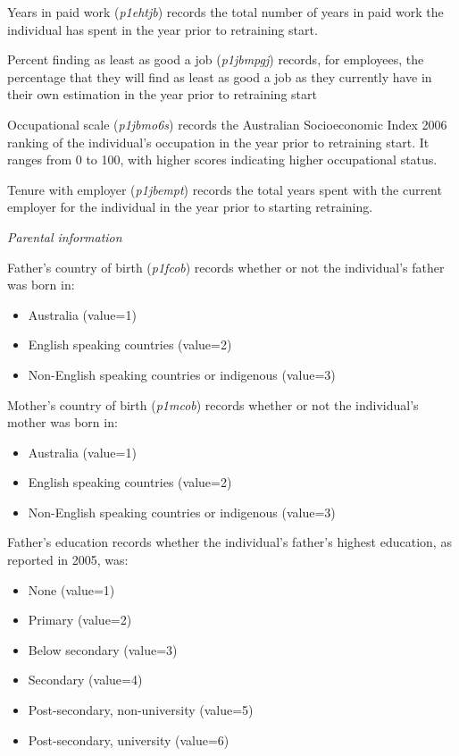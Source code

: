\documentclass[12pt, a4paper]{article}
\begin{document}
Years in paid work (\textit{p1\textunderscore{}ehtjb})  records the total number of years in paid work the individual has spent in the year prior to retraining start.

Percent finding as least as good a job (\textit{p1\textunderscore{}jbmpgj})  records, for employees, the percentage that they will find as least as good a job as they currently have in their own estimation in the year prior to retraining start

Occupational scale (\textit{p1\textunderscore{}jbmo6s}) records the Australian Socioeconomic Index 2006 ranking of the individual’s occupation in the year prior to retraining start. It ranges from 0 to 100, with higher scores indicating higher occupational status. 

Tenure with employer (\textit{p1\textunderscore{}jbempt}) records the total years spent with the current employer for the individual in the year prior to starting retraining.

\emph{Parental information}

Father’s country of birth (\textit{p1\textunderscore{}fcob}) records whether or not the individual’s father was born in:
\begin{itemize}
  \item Australia (value=1) 
  \item English speaking countries (value=2)
  \item Non-English speaking countries or indigenous (value=3)
\end{itemize}  

Mother’s country of birth (\textit{p1\textunderscore{}mcob}) records whether or not the individual’s mother was born in:
\begin{itemize}
  \item Australia (value=1)
  \item English speaking countries (value=2)
  \item Non-English speaking countries or indigenous (value=3)
\end{itemize}  

Father’s education records whether the individual’s father’s highest education, as reported in 2005, was:
\begin{itemize}
  \item None (value=1)
  \item Primary (value=2)
  \item Below secondary (value=3)
  \item Secondary (value=4)
  \item Post-secondary, non-university (value=5)
  \item Post-secondary, university (value=6)
\end{itemize}  
\end{document}
